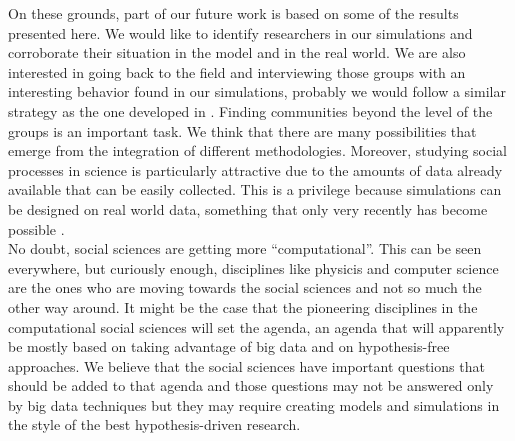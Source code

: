 \documentclass[11pt]{article}
\begin{document}
{{\color{red}On these grounds, part of our future work is based on some of the results presented here. We would like to
identify researchers in our simulations and corroborate their situation in the model and in the real world. We are
also interested in going back to the field and interviewing those groups with an interesting behavior found in our
simulations, probably we would follow a similar strategy as the one developed in \cite{Haraetal2003}. Finding
communities beyond the level of the groups is an important task. We think that there are many possibilities that emerge
from the integration of different methodologies. Moreover, studying social processes in science is particularly
attractive due to the amounts of data already available that can be easily collected. This is a privilege because
simulations can be designed on real world data, something that only very recently has become possible
\cite{Barabasi2011}.\\


No doubt, social sciences are getting more ``computational''. This can be seen everywhere, but curiously enough,
disciplines like physicis and computer science are the ones who are moving towards the social sciences and not so much
the other way around. It might be the case that the pioneering disciplines in the computational social sciences will set
the agenda, an agenda that will apparently be mostly based on taking advantage of big data and on hypothesis-free approaches. We
believe that the social sciences have important questions that should be added to that agenda and those questions may not
be answered only by big data techniques but they may require creating models and simulations in the style of the best
hypothesis-driven research.} 
 

}
\end{document}
